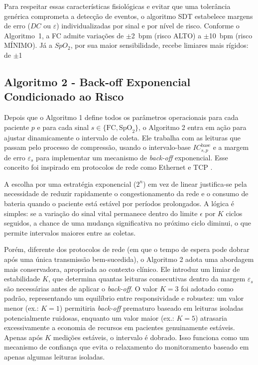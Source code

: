 \documentclass[twoside,english,brazilian]{UNISINOSmonografia}
\begin{document}
Para respeitar essas características fisiológicas e evitar que uma tolerância genérica comprometa a detecção de eventos, o algoritmo SDT estabelece margens de erro ($DC$ ou $\varepsilon$) individualizadas por sinal e por nível de risco. Conforme o Algoritmo~1, a FC admite variações de $\pm$2~bpm (risco ALTO) a $\pm$10~bpm (risco MÍNIMO). Já a $SpO_2$, por sua maior sensibilidade, recebe limiares mais rígidos: de $\pm$1%

\subsection{Algoritmo 2 - Back-off Exponencial Condicionado ao Risco}
\label{alg2}
Depois que o Algoritmo 1 define todos os parâmetros operacionais para cada paciente $p$ e para cada sinal $s \in \{\text{FC},\text{SpO}_2\}$, o Algoritmo 2 entra em ação para ajustar dinamicamente o intervalo de coleta. Ele trabalha com as leituras que passam pelo processo de compressão, usando o intervalo-base $IC^{\text{base}}_{s,p}$ e a margem de erro $\varepsilon_s$ para implementar um mecanismo de \textit{back-off} exponencial. Esse conceito foi inspirado em protocolos de rede como Ethernet e TCP \cite{Jacobson1988}.

A escolha por uma estratégia exponencial ($2^n$) em vez de linear justifica-se pela necessidade de reduzir rapidamente o congestionamento da rede e o consumo de bateria quando o paciente está estável por períodos prolongados. A lógica é simples: se a variação do sinal vital permanece dentro do limite $\epsilon$ por $K$ ciclos seguidos, a chance de uma mudança significativa no próximo ciclo diminui, o que permite intervalos maiores entre as coletas.

Porém, diferente dos protocolos de rede (em que o tempo de espera pode dobrar após uma única transmissão bem-sucedida), o Algoritmo 2 adota uma abordagem mais conservadora, apropriada ao contexto clínico. Ele introduz um limiar de estabilidade $K$, que determina quantas leituras consecutivas dentro da margem $\varepsilon_s$ são necessárias antes de aplicar o \textit{back-off}. O valor $K = 3$ foi adotado como padrão, representando um equilíbrio entre responsividade e robustez: um valor menor (ex.: $K = 1$) permitiria \textit{back-off} prematuro baseado em leituras isoladas potencialmente ruidosas, enquanto um valor maior (ex.: $K = 5$) atrasaria excessivamente a economia de recursos em pacientes genuinamente estáveis. Apenas após $K$ medições estáveis, o intervalo é dobrado. Isso funciona como um mecanismo de confiança que evita o relaxamento do monitoramento baseado em apenas algumas leituras isoladas.
\end{document}
